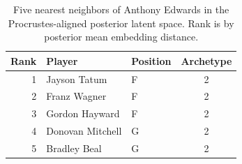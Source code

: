 \begin{table}[htbp]
  \centering\small
  \begin{tabular}{rllc}
    \toprule
    Rank & Player & Position & Archetype \\
    \midrule
    1 & Jayson Tatum & F & 2 \\
    2 & Franz Wagner & F & 2 \\
    3 & Gordon Hayward & F & 2 \\
    4 & Donovan Mitchell & G & 2 \\
    5 & Bradley Beal & G & 2 \\
    \bottomrule
  \end{tabular}
  \caption{Five nearest neighbors of Anthony Edwards in the Procrustes-aligned posterior latent space. Rank is by posterior mean embedding distance.}
\end{table}

